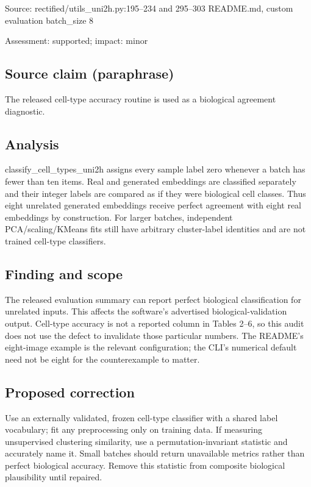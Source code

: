 \documentclass[11pt]{article}
\begin{document}
Source: rectified/utils\_uni2h.py:195–234 and 295–303 README.md, custom evaluation batch\_size 8

Assessment: supported; impact: minor

\subsection*{Source claim (paraphrase)}

The released cell-type accuracy routine is used as a biological agreement diagnostic.

\subsection*{Analysis}

classify\_cell\_types\_uni2h assigns every sample label zero whenever a batch has fewer than ten items. Real and generated embeddings are classified separately and their integer labels are compared as if they were biological cell classes. Thus eight unrelated generated embeddings receive perfect agreement with eight real embeddings by construction. For larger batches, independent PCA/scaling/KMeans fits still have arbitrary cluster-label identities and are not trained cell-type classifiers.

\subsection*{Finding and scope}

The released evaluation summary can report perfect biological classification for unrelated inputs. This affects the software's advertised biological-validation output. Cell-type accuracy is not a reported column in Tables 2–6, so this audit does not use the defect to invalidate those particular numbers. The README's eight-image example is the relevant configuration; the CLI's numerical default need not be eight for the counterexample to matter.

\subsection*{Proposed correction}

Use an externally validated, frozen cell-type classifier with a shared label vocabulary; fit any preprocessing only on training data. If measuring unsupervised clustering similarity, use a permutation-invariant statistic and accurately name it. Small batches should return unavailable metrics rather than perfect biological accuracy. Remove this statistic from composite biological plausibility until repaired.
\end{document}
